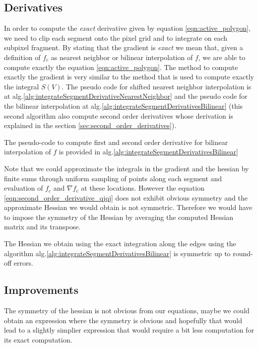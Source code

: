\documentclass[11pt]{article}
\begin{document}
 \subsection{Derivatives}
 
 In order to compute the \emph{exact} derivative given by equation \ref{eqn:active_polygon}, we need to clip each segment onto the pixel grid and to integrate on each subpixel fragment. 
By stating that the gradient is \emph{exact} we mean that, given a definition of $f_c$ as nearest neighbor or bilinear interpolation of $f$, we are able to compute exactly the equation \ref{eqn:active_polygon}. The method to compute exactly the gradient is very similar to the method that is used to compute exactly the integral $S(V)$. The pseudo code for shifted nearest neighbor interpolation is at alg.\ref{alg:integrateSegmentDerivativeNearestNeighbor} and the pseudo code for the bilinear interpolation at alg.\ref{alg:integrateSegmentDerivativesBilinear} (this second algorithm also compute second order derivatives whose derivation is explained in the section \ref{sec:second_order_derivatives}).
    



The pseudo-code to compute first and second order derivative for bilinear interpolation of $f$ is provided in alg.\ref{alg:integrateSegmentDerivativesBilinear} 

Note that we could approximate the integrals in the gradient and the hessian by finite sums through uniform sampling of points along each segment and evaluation of $f_c$ and $\nabla f_c$ at these locations. However the equation \ref{eqn:second_order_derivative_qjqj} does not exhibit obvious symmetry and the approximate Hessian we would obtain is not symmetric. Therefore we would have to impose the symmetry of the Hessian by averaging the computed Hessian matrix and its transpose.

The Hessian we obtain using the exact integration along the edges using the algorithm alg.\ref{alg:integrateSegmentDerivativesBilinear} is symmetric up to round-off errors. 
\subsection{Improvements}
The symmetry of the hessian is not obvious from our  equations, maybe we could obtain an expression where the symmetry is obvious and hopefully that would lead to a slightly simplier expression that would require a bit less computation for its exact computation.
\end{document}
